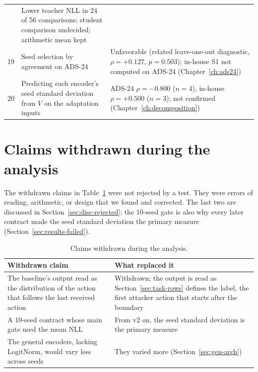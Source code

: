 {\begin{xltabular}{\textwidth}{@{}r>{\raggedright\arraybackslash}p{0.33\textwidth}>{\raggedright\arraybackslash}X@{}}
  & Lower teacher NLL in 24 of 56 comparisons; student comparison
    undecided; arithmetic mean kept \\
19 & Seed selection by agreement on ADS-24
    & Unfavorable (related leave-one-out diagnostic, $\rho = +0.127$,
    $p = 0.503$); in-house S1 not computed on ADS-24
    (Chapter~\ref{ch:ads24}) \\
20 & Predicting each encoder's seed standard deviation from $V$ on the adaptation inputs
    & ADS-24 $\rho = -0.800$ ($n = 4$), in-house $\rho = +0.500$ ($n = 3$);
    not confirmed (Chapter~\ref{ch:decomposition}) \\
\end{xltabular}}

\section{Claims withdrawn during the analysis}
\label{sec:rej-withdrawn}

The withdrawn claims in Table~\ref{tab:rej-withdrawn} were not
rejected by a test. They were errors of reading, arithmetic, or design
that we found and corrected. The last two are discussed in Section~\ref{sec:disc-rejected};
the 10-seed gate is also why every later contract made the seed standard
deviation the primary measure (Section~\ref{sec:results-failed}).

\begin{table}[htbp]
\centering
\small
\caption{Claims withdrawn during the analysis.}
\label{tab:rej-withdrawn}
\begin{tabularx}{\textwidth}{@{}>{\raggedright\arraybackslash}X>{\raggedright\arraybackslash}X@{}}
\toprule
Withdrawn claim & What replaced it \\
\midrule
The baseline's output read as the distribution of the action that
follows the last received action
  & Withdrawn; the output is read as Section~\ref{sec:task-rows}
    defines the label, the first attacker action that starts after the
    boundary \\
A 10-seed contract whose main gate used the mean NLL
  & From v2 on, the seed standard deviation is the primary measure \\
The general encoders, lacking LogitNorm, would vary less across seeds
  & They varied more (Section~\ref{sec:gen-arch}) \\
\bottomrule
\end{tabularx}
\end{table}

